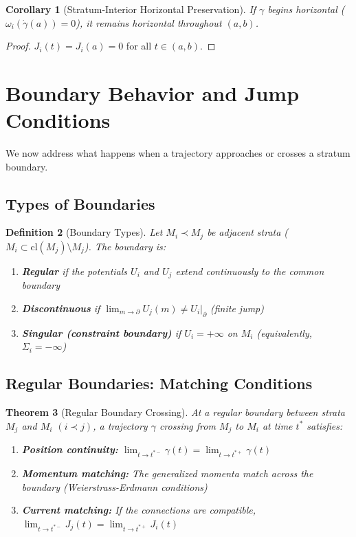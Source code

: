 \documentclass[11pt,a4paper]{article}
\newtheorem{theorem}{Theorem}[section]
\newtheorem{corollary}[theorem]{Corollary}
\newtheorem{definition}[theorem]{Definition}
\begin{document}
\begin{corollary}[Stratum-Interior Horizontal Preservation]
If $\gamma$ begins horizontal ($\omega_i(\dot{\gamma}(a)) = 0$), it remains horizontal throughout $(a, b)$.
\end{corollary}

\begin{proof}
$J_i(t) = J_i(a) = 0$ for all $t \in (a, b)$.
\end{proof}

\section{Boundary Behavior and Jump Conditions}\label{sec:boundary}

We now address what happens when a trajectory approaches or crosses a stratum boundary.

\subsection{Types of Boundaries}

\begin{definition}[Boundary Types]
Let $M_i \prec M_j$ be adjacent strata ($M_i \subset \mathrm{cl}(M_j) \setminus M_j$). The boundary is:
\begin{enumerate}
    \item \textbf{Regular} if the potentials $U_i$ and $U_j$ extend continuously to the common boundary
    \item \textbf{Discontinuous} if $\lim_{m \to \partial} U_j(m) \neq U_i|_\partial$ (finite jump)
    \item \textbf{Singular (constraint boundary)} if $U_i = +\infty$ on $M_i$ (equivalently, $\Sigma_i = -\infty$)
\end{enumerate}
\end{definition}

\subsection{Regular Boundaries: Matching Conditions}

\begin{theorem}[Regular Boundary Crossing]
At a regular boundary between strata $M_j$ and $M_i$ $(i \prec j)$, a trajectory $\gamma$ crossing from $M_j$ to $M_i$ at time $t^*$ satisfies:
\begin{enumerate}
    \item[(i)] \textbf{Position continuity:} $\lim_{t \to t^{*-}} \gamma(t) = \lim_{t \to t^{*+}} \gamma(t)$
    \item[(ii)] \textbf{Momentum matching:} The generalized momenta match across the boundary (Weierstrass-Erdmann conditions)
    \item[(iii)] \textbf{Current matching:} If the connections are compatible, $\lim_{t \to t^{*-}} J_j(t) = \lim_{t \to t^{*+}} J_i(t)$
\end{enumerate}
\end{theorem}
\end{document}

